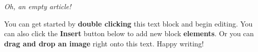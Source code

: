 \textit{Oh, an empty article!} 

You can get started by \textbf{double clicking} this text block and begin editing. You can also click the \textbf{Insert} button below to add new block \textbf{elements}. Or you can \textbf{drag and drop an image} right onto this text. Happy writing!

\cite{kass_bayes_1993}

\cite{goodman_toward_1999}